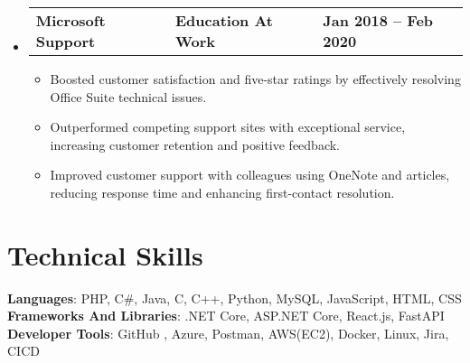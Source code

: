 \documentclass[letterpaper,11pt]{article}
\begin{document}
\begin{itemize}[leftmargin=0.15in, itemsep=0pt, parsep=0pt, label={}]
	\item{
	            \begin{tabu} to \dimexpr\textwidth-0.15in {X[l] X[c] X[r]}
		            \textbf{Microsoft Support} & \textbf{Education At Work} & \textbf{Jan 2018 -- Feb 2020} \\
	            \end{tabu}
	            \begin{itemize} [label=$\bullet$]
		            \item{Boosted customer satisfaction and five-star ratings by effectively resolving Office Suite technical issues.}
		            \item{Outperformed competing support sites with exceptional service, increasing customer retention and positive
		                        feedback.}
		            \item{Improved customer support with colleagues using OneNote and articles, reducing response time and enhancing
		                        first-contact resolution.}
	            \end{itemize}
	      }

\end{itemize}


\section{\textbf{Technical Skills}}
\begin{itemize}[leftmargin=0.15in, itemsep=0pt, parsep=0pt, label={}]
	\small{\item{
		            \textbf{Languages}{: PHP, C\#, Java, C, C++, Python, MySQL,  JavaScript, HTML, CSS} \\
		            \textbf{Frameworks And Libraries}{: .NET Core, ASP.NET Core, React.js, FastAPI} \\
		            \textbf{Developer Tools}{: GitHub , Azure, Postman, AWS(EC2), Docker, Linux, Jira, CI\/CD} \\
		      }}
\end{itemize}


\end{document}
